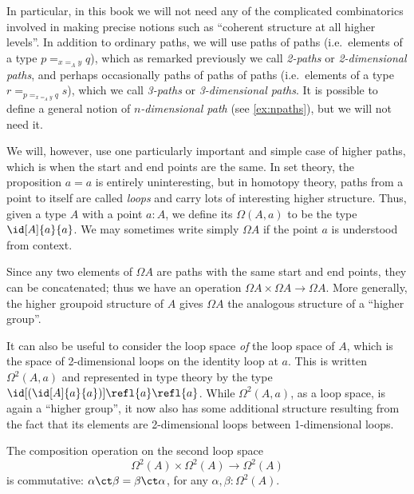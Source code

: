 In particular, in this book we will not need any of the complicated combinatorics involved in making precise notions such as ``coherent structure at all higher levels''.
In addition to ordinary paths, we will use paths of paths (i.e.\ elements of a type $p =_{x=_A y} q$), which as remarked previously we call \emph{2-paths} or \emph{2-dimensional paths}, and perhaps occasionally paths of paths of paths (i.e.\ elements of a type $r = _{p =_{x=_A y} q} s$), which we call \emph{3-paths} or \emph{3-dimensional paths}.
It is possible to define a general notion of \emph{$n$-dimensional path}
%
%
%
%
(see \cref{ex:npaths}), but we will not need it.

We will, however, use one particularly important and simple case of higher paths, which is when the start and end points are the same.
In set theory, the proposition $a=a$ is entirely uninteresting, but in homotopy theory, paths from a point to itself are called \emph{loops} and carry lots of interesting higher structure.
Thus, given a type $A$ with a point $a:A$, we define its 
%
$\Omega(A,a)$ to be the type $\id[A]{a}{a}$.
We may sometimes write simply $\Omega A$ if the point $a$ is understood from context.

Since any two elements of $\Omega A$ are paths with the same start and end points, they can be concatenated;
thus we have an operation $\Omega A\times \Omega A\to \Omega A$.
More generally, the higher groupoid structure of $A$ gives $\Omega A$ the analogous structure of a ``higher group''.

It can also be useful to consider the loop space \emph{of} the loop space of $A$, which is the space of 2-dimensional loops on the identity loop at $a$.
This is written $\Omega^2(A,a)$ and represented in type theory by the type $\id[({\id[A]{a}{a}})]{\refl{a}}{\refl{a}}$.
While $\Omega^2(A,a)$, as a loop space, is again a ``higher group'', it now also has some additional structure resulting from the fact that its elements are 2-dimensional loops between 1-dimensional loops.

\begin{thm}\label{thm:EckmannHilton}
  The composition operation on the second loop space
  \begin{equation*}
    \Omega^2(A)\times \Omega^2(A)\to \Omega^2(A)
  \end{equation*}
  is commutative: $\alpha\ct\beta = \beta\ct\alpha$, for any $\alpha, \beta:\Omega^2(A)$.
\end{thm}

